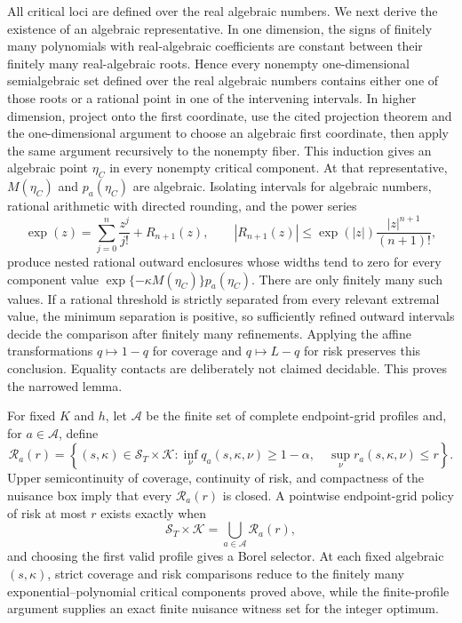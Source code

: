 All critical loci are defined over the real algebraic numbers.  We next derive the existence of an algebraic representative.  In one dimension, the signs of finitely many polynomials with real-algebraic coefficients are constant between their finitely many real-algebraic roots.  Hence every nonempty one-dimensional semialgebraic set defined over the real algebraic numbers contains either one of those roots or a rational point in one of the intervening intervals.  In higher dimension, project onto the first coordinate, use the cited projection theorem and the one-dimensional argument to choose an algebraic first coordinate, then apply the same argument recursively to the nonempty fiber.  This induction gives an algebraic point \(\eta_C\) in every nonempty critical component.  At that representative, \(M(\eta_C)\) and \(p_a(\eta_C)\) are algebraic.  Isolating intervals for algebraic numbers, rational arithmetic with directed rounding, and the power series
\[
 \exp(z)=\sum_{j=0}^{n}\frac{z^j}{j!}+R_{n+1}(z),
 \qquad
 |R_{n+1}(z)|\le
 \exp(|z|)\frac{|z|^{n+1}}{(n+1)!},
\]
produce nested rational outward enclosures whose widths tend to zero for every component value \(\exp\{-\kappa M(\eta_C)\}p_a(\eta_C)\).  There are only finitely many such values.  If a rational threshold is strictly separated from every relevant extremal value, the minimum separation is positive, so sufficiently refined outward intervals decide the comparison after finitely many refinements.  Applying the affine transformations \(q\mapsto1-q\) for coverage and \(q\mapsto L-q\) for risk preserves this conclusion.  Equality contacts are deliberately not claimed decidable.  This proves the narrowed lemma.

For fixed \(K\) and \(h\), let \(\mathcal A\) be the finite set of complete endpoint-grid profiles and, for \(a\in\mathcal A\), define
\[
 \mathcal R_a(r)=\left\{(s,\kappa)\in\mathcal S_T\times\mathcal K:
 \inf_{\nu}q_a(s,\kappa,\nu)\ge1-\alpha,
 \quad
 \sup_{\nu}r_a(s,\kappa,\nu)\le r
 \right\}.
\]
Upper semicontinuity of coverage, continuity of risk, and compactness of the nuisance box imply that every \(\mathcal R_a(r)\) is closed.  A pointwise endpoint-grid policy of risk at most \(r\) exists exactly when
\[
 \mathcal S_T\times\mathcal K=\bigcup_{a\in\mathcal A}\mathcal R_a(r),
\]
and choosing the first valid profile gives a Borel selector.  At each fixed algebraic \((s,\kappa)\), strict coverage and risk comparisons reduce to the finitely many exponential--polynomial critical components proved above, while the finite-profile argument supplies an exact finite nuisance witness set for the integer optimum.

